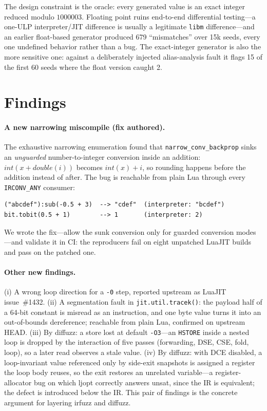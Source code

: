 \documentclass[runningheads]{llncs}
\newcommand{\full}[1]{#1}
\newcommand{\brief}[1]{}
\newcommand{\full}[1]{}
\newcommand{\brief}[1]{#1}
\newcommand{\ljopt}{\textsf{ljopt}}
\newcommand{\irfuzz}{\textsf{irfuzz}}
\newcommand{\diffuzz}{\textsf{diffuzz}}
\newcommand{\ir}[1]{\texttt{#1}}
\begin{document}
\full{The design constraint is the oracle: every}\brief{Every} generated
value is an exact integer reduced modulo $1000003$. Floating point ruins
end-to-end differential testing---a one-ULP interpreter/JIT difference is
usually a legitimate \texttt{libm} difference\full{---and an earlier
float-based generator produced 679 ``mismatches'' over 15k seeds, every one
undefined behavior rather than a bug}. The exact-integer generator is also
the more sensitive one: against a deliberately injected alias-analysis
fault it flags 15 of the first 60 seeds where the float version caught 2.

\section{Findings}\label{sec:findings}

\paragraph{A new narrowing miscompile (fix authored).}
The exhaustive narrowing enumeration found that
\texttt{narrow\_conv\_backprop} sinks an \emph{unguarded}
number-to-integer conversion inside an addition:
$\mathit{int}(x + \mathit{double}(i))$ becomes $\mathit{int}(x) + i$, so
rounding happens before the addition instead of after. The bug is reachable
from plain Lua through every \ir{IRCONV\_ANY} consumer:

\begin{lstlisting}
("abcdef"):sub(-0.5 + 3)  --> "cdef"  (interpreter: "bcdef")
bit.tobit(0.5 + 1)        --> 1       (interpreter: 2)
\end{lstlisting}

\noindent
We wrote the fix---allow the sunk conversion only for guarded conversion
modes---and validate it in CI: the reproducers fail on eight unpatched
LuaJIT builds and pass on the patched one.

\paragraph{Other new findings.}
(i) A wrong loop direction for a \texttt{-0} step, reported upstream as
LuaJIT issue~\#1432.
(ii) A segmentation fault in \texttt{jit.util.tracek()}: the payload half
of a 64-bit constant is misread as an instruction, and one byte value turns
it into an out-of-bounds dereference; reachable from plain Lua, confirmed
on upstream HEAD.
(iii) By \diffuzz{}: a store lost at default \texttt{-O3}---an
\ir{HSTORE} inside a nested loop is dropped by the interaction of five
passes (forwarding, DSE, CSE, fold, loop), so a later read observes a stale
value.
(iv) By \diffuzz{}: with DCE disabled, a loop-invariant value referenced
only by side-exit snapshots is assigned a register the loop body reuses, so
the exit restores an unrelated variable---a register-allocator bug on which
\ljopt{} correctly answers \textsf{unsat}, since the IR is equivalent; the
defect is introduced below the IR. This pair of findings is the concrete
argument for layering \irfuzz{} and \diffuzz{}.
\end{document}

